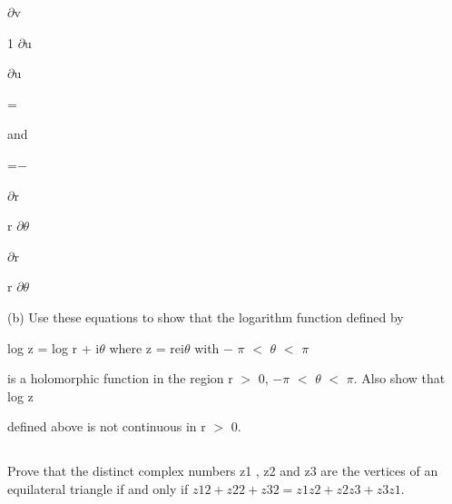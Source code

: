 $\partial$v




1 $\partial$u




$\partial$u



=



and



=$-$



$\partial$r




r $\partial$$\theta$




$\partial$r




r $\partial$$\theta$




(b) Use these equations to show that the logarithm function defined by




log z = log r + i$\theta$ where z = rei$\theta$ with $-$ $\pi$ $<$ $\theta$ $<$ $\pi$




is a holomorphic function in the region r $>$ 0, $-$$\pi$ $<$ $\theta$ $<$ $\pi$. Also show that log z




defined above is not continuous in r $>$ 0.




\subsection{}
Prove that the distinct complex numbers z1 , z2 and z3 are the vertices of an equilateral triangle if and only if
$z12 + z22 + z32 = z1 z2 + z2 z3 + z3 z1$.